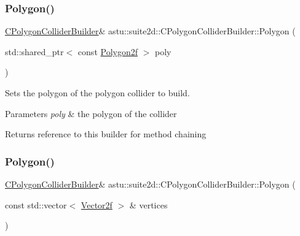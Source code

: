 \subsubsection{\texorpdfstring{Polygon()}{Polygon()}\hspace{0.1cm}{\footnotesize\ttfamily [1/2]}}
{\footnotesize\ttfamily \hyperlink{classastu_1_1suite2d_1_1CPolygonColliderBuilder}{C\+Polygon\+Collider\+Builder}\& astu\+::suite2d\+::\+C\+Polygon\+Collider\+Builder\+::\+Polygon (\begin{DoxyParamCaption}\item[{std\+::shared\+\_\+ptr$<$ const \hyperlink{group__math__group_ga39ca0cd425ff5edd2a090d6997ce8c2a}{Polygon2f} $>$}]{poly }\end{DoxyParamCaption})\hspace{0.3cm}{\ttfamily [inline]}}

Sets the polygon of the polygon collider to build.


\begin{DoxyParams}{Parameters}
{\em poly} & the polygon of the collider \\
\hline
\end{DoxyParams}
\begin{DoxyReturn}{Returns}
reference to this builder for method chaining 
\end{DoxyReturn}
\mbox{\label{classastu_1_1suite2d_1_1CPolygonColliderBuilder_a11e3b9cace57e712bfae12de926458bb}} 
\subsubsection{\texorpdfstring{Polygon()}{Polygon()}\hspace{0.1cm}{\footnotesize\ttfamily [2/2]}}
{\footnotesize\ttfamily \hyperlink{classastu_1_1suite2d_1_1CPolygonColliderBuilder}{C\+Polygon\+Collider\+Builder}\& astu\+::suite2d\+::\+C\+Polygon\+Collider\+Builder\+::\+Polygon (\begin{DoxyParamCaption}\item[{const std\+::vector$<$ \hyperlink{classastu_1_1Vector2}{Vector2f} $>$ \&}]{vertices }\end{DoxyParamCaption})\hspace{0.3cm}{\ttfamily [inline]}}

